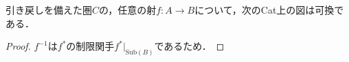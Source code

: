 \documentclass[uplatex, 12pt, dvipdfmx]{jsarticle}
\begin{document}
\begin{corollary}\label{corollary-pullbackfunctor-and-inversmapping}
    引き戻しを備えた圏$C$の，任意の射$f:A\to B$について，次のCat上の図は可換である．
    \begin{center}
    \end{center}
\end{corollary}
\begin{proof}
    $f^{-1}$は$f^*$の制限関手$f^*|_{\mathrm{Sub}(B)}$であるため．
\end{proof}
\end{document}
